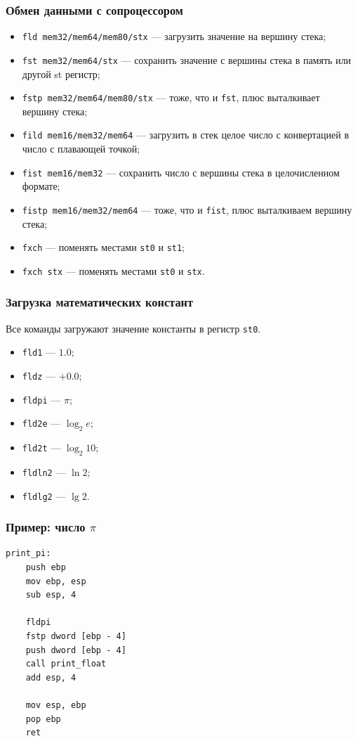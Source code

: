 \documentclass[utf8, russian, aspectratio=1610]{beamer}
\begin{document}
\begin{frame}
    \frametitle{Обмен данными с сопроцессором}

    \begin{itemize}
        \item {\tt fld mem32/mem64/mem80/stx} --- загрузить значение на вершину стека;
        \item {\tt fst mem32/mem64/stx} --- сохранить значение с вершины стека в память или другой st регистр;
        \item {\tt fstp mem32/mem64/mem80/stx} --- тоже, что и {\tt fst}, плюс выталкивает вершину стека;
        \item {\tt fild mem16/mem32/mem64} --- загрузить в стек целое число с конвертацией в число с плавающей точкой;
        \item {\tt fist mem16/mem32} --- сохранить число с вершины стека в целочисленном формате;
        \item {\tt fistp mem16/mem32/mem64} --- тоже, что и {\tt fist}, плюс выталкиваем вершину стека;
        \item {\tt fxch} --- поменять местами {\tt st0} и {\tt st1};
        \item {\tt fxch stx} --- поменять местами {\tt st0} и {\tt stx}.
    \end{itemize}
\end{frame}

\begin{frame}
    \frametitle{Загрузка математических констант}
    Все команды загружают значение константы в регистр {\tt st0}.
    \begin{itemize}
        \item {\tt fld1} --- $1.0$;
        \item {\tt fldz} --- $+0.0$;
        \item {\tt fldpi} --- $\pi$;
        \item {\tt fld2e} --- $\log_2 e$;
        \item {\tt fld2t} --- $\log_2 10$;
        \item {\tt fldln2} --- $\ln 2$;
        \item {\tt fldlg2} --- $\lg 2$.
    \end{itemize}
\end{frame}

\begin{frame}[fragile]
    \frametitle{Пример: число $\pi$}
\begin{verbatim}
print_pi:
    push ebp
    mov ebp, esp
    sub esp, 4

    fldpi
    fstp dword [ebp - 4]
    push dword [ebp - 4]
    call print_float
    add esp, 4

    mov esp, ebp
    pop ebp
    ret
\end{verbatim}
\end{frame}
\end{document}
